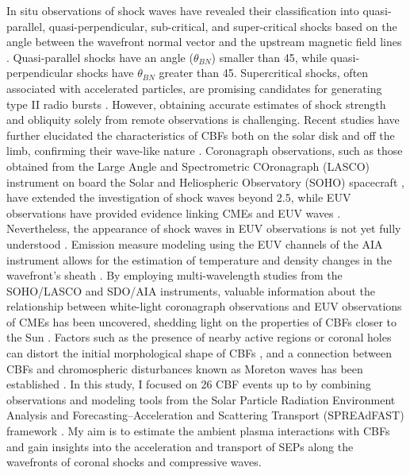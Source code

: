 In situ observations of shock waves have revealed their classification into quasi-parallel, quasi-perpendicular, sub-critical, and super-critical shocks based on the angle between the wavefront normal vector and the upstream magnetic field lines \citep{tsurutani_1985}. Quasi-parallel shocks have an angle ($\theta_{BN}$) smaller than 45\degree, while quasi-perpendicular shocks have $\theta_{BN}$ greater than 45\degree. Supercritical shocks, often associated with accelerated particles, are promising candidates for generating type II radio bursts \citep{benz_1988}. However, obtaining accurate estimates of shock strength and obliquity solely from remote observations is challenging.
Recent studies have further elucidated the characteristics of CBFs both on the solar disk and off the limb, confirming their wave-like nature \citep{nitta_2013, long_2011, olmedo_2012}. Coronagraph observations, such as those obtained from the Large Angle and Spectrometric COronagraph (LASCO) instrument on board the Solar and Heliospheric Observatory (SOHO) spacecraft \citep{domingo_1995}, have extended the investigation of shock waves beyond 2.5\rsun \citep{vourlidas_2003}, while EUV observations have provided evidence linking CMEs and EUV waves \citep{patsourakos_2009}. Nevertheless, the appearance of shock waves in EUV observations is not yet fully understood \citep{kozarev_2011}. Emission measure modeling using the EUV channels of the AIA instrument allows for the estimation of temperature and density changes in the wavefront's sheath \citep{kozarev_2011}. By employing multi-wavelength studies from the SOHO/LASCO and SDO/AIA instruments, valuable information about the relationship between white-light coronagraph observations and EUV observations of CMEs has been uncovered, shedding light on the properties of CBFs closer to the Sun \citep{warmuth_2015}. Factors such as the presence of nearby active regions or coronal holes can distort the initial morphological shape of CBFs \citep{ofman_2002, mann_2003, piantschitsch_2018}, and a connection between CBFs and chromospheric disturbances known as Moreton waves has been established \citep{thompson_1999b}.
In this study, I focused on 26 CBF events up to \rsun by combining observations and modeling tools from the Solar Particle Radiation Environment Analysis and Forecasting--Acceleration and Scattering Transport (SPREAdFAST) framework \citep{kozarev_2022}. My aim is to estimate the ambient plasma interactions with CBFs and gain insights into the acceleration and transport of SEPs along the wavefronts of coronal shocks and compressive waves.
